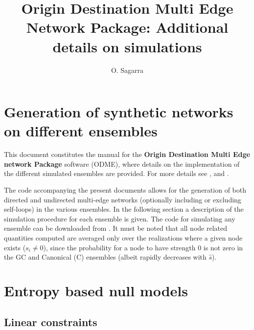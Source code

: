 \documentclass[aps,floatfix,noshowpacs,superscriptaddress]{revtex4}
\begin{document}
\title{Origin Destination Multi Edge Network Package: Additional details on simulations}
\author{O. Sagarra}


\maketitle

\section{Generation of synthetic networks on different ensembles}
\label{app_simus}

This document constitutes the manual for the \textbf{Origin Destination Multi Edge network Package} software (ODME), where details on the implementation of the different simulated ensembles are provided. For more details see \cite{Sagarra2013c}, \cite{Sagarra2014} and \cite{Supersampling}.


The code accompanying the present documents allows for the generation of both directed and undirected multi-edge networks (optionally including or excluding self-loops) in the various ensembles. In the following section a description of the simulation procedure for each ensemble is given. The code for simulating any ensemble can be downloaded from \cite{github}. It must be noted that all node related quantities computed are averaged only over the realizations where a given node exists ($s_i\neq 0$), since the probability for a node to have strength $0$ is not zero in the GC and Canonical (C) ensembles (albeit rapidly decreases with $\hat{s}$). 

\section{Entropy based null models}
\subsection{Linear constraints}
\end{document}
